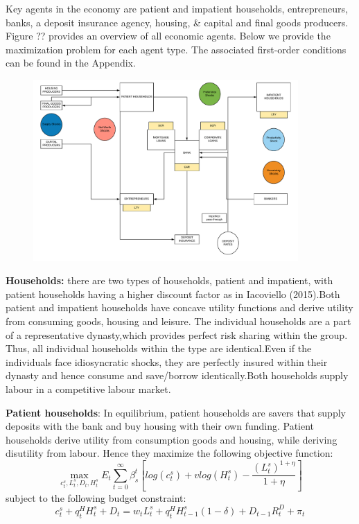 \documentclass[12pt]{article}
\numberwithin{equation}{section}
\begin{document}
Key agents in the economy are patient and impatient households, entrepreneurs, banks, a deposit insurance agency, housing, \& capital and final goods producers. Figure ?? provides an overview of all economic agents. Below we provide the maximization problem for each agent type. The associated first-order conditions can be found in the Appendix. 


\begin{figure}[H]
	\label{model_overview_chart}
\includegraphics[width=0.9\textwidth]{3d_model_overview.pdf}
\end{figure}

\textbf{Households:} there are two types of households, patient and impatient, with patient households having a higher discount factor as in Iacoviello (2015).Both patient and impatient households have concave utility functions and derive utility from consuming goods, housing and leisure. The individual households are a part of a representative dynasty,which provides perfect risk sharing within the group. Thus, all individual households within the type are identical.Even if the individuals face idiosyncratic shocks, they are perfectly insured within their dynasty and hence consume and save/borrow identically.Both households supply labour in a competitive labour market.

\textbf{Patient households}:
In equilibrium, patient households are savers that supply deposits with the bank and buy housing with their own funding.
Patient households derive utility from consumption goods and housing, while deriving disutility from labour. Hence they maximize the following objective function:
\begin{equation}
\max_{c^s_t,L^s_t,D_{t},H^s_t}E_t\sum _{t=0}^{\infty } \beta_{s}^t [log(c^s_t)+vlog(H^s_t)-\frac{(L^s_t)^{1+\eta}}{1+\eta} ]
\end{equation}
subject to the following budget constraint:
\begin{equation}
c^s_t+q^H_{t}H^s_{t} +{D_{t}}=w_{t}L^s_{t}+q^H_{t}H^s_{t-1}(1-\delta)+{D_{t-1}}R^D_{t}+\pi_{t}
\end{equation}
\end{document}
